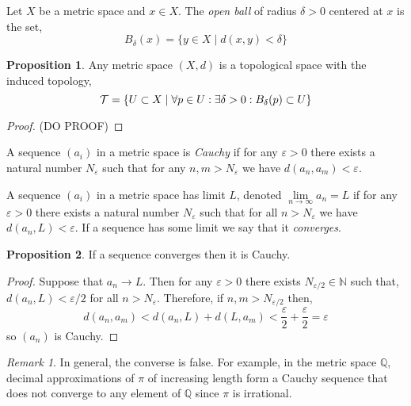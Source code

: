 \documentclass{article}
\newcommand{\N}{\mathbb{N}}
\newcommand{\ball}[2]{B_{#1} \! \left(#2 \right)}
\newcommand{\Q}{\mathbb{Q}}
\newenvironment{definition}[1][Definition:]{\begin{trivlist}
\item[\hskip \labelsep {\bfseries #1}]}{\end{trivlist}}
\theoremstyle{theorem}
\theoremstyle{definition}
\theoremstyle{definition}
\newtheorem*{proposition}{Proposition}
\theoremstyle{remark}
\theoremstyle{definition}
\theoremstyle{remark}
\newtheorem{remark}{Remark}[subsection]
\begin{document}
\begin{definition}
Let $X$ be a metric space and $x \in X$. The \textit{open ball} of radius $\delta > 0$ centered at $x$ is the set,
\[ \ball{\delta}{x} = \{ y \in X \mid d(x,y) < \delta \}\]
\end{definition}

\begin{proposition}
Any metric space $(X, d)$ is a topological space with the induced topology,
\[ \T = \{ U \subset X \mid \forall p \in U : \exists \delta > 0 : \ball{\delta}{p} \subset U \} \]
\end{proposition}

\begin{proof}
(DO PROOF)
\end{proof}

\begin{definition}
A sequence $(a_i)$ in a metric space is \textit{Cauchy} if for any $\varepsilon > 0$ there exists a natural number $N_{\varepsilon}$ such that for any $n,m > N_{\varepsilon}$ we have $d(a_n, a_m) < \varepsilon$. 
\end{definition}

\begin{definition}
A sequence $(a_i)$ in a metric space has limit $L$, denoted $\lim\limits_{n \to \infty} a_n = L$ if for any $\varepsilon > 0$ there exists a natural number $N_{\varepsilon}$ such that for all $n > N_{\varepsilon}$ we have $d(a_n, L) < \varepsilon$. If a sequence has some limit we say that it \textit{converges}.
\end{definition}

\begin{proposition}
If a sequence converges then it is Cauchy. 
\end{proposition}

\begin{proof}
Suppose that $a_n \to L$. Then for any $\varepsilon > 0$ there exists $N_{\varepsilon/2} \in \N$ such that, $d(a_n, L) < \varepsilon/2$ for all $n > N_{\varepsilon}$. Therefore, if $n,m > N_{\varepsilon/2}$ then,
\[ d(a_n, a_m) < d(a_n, L) + d(L, a_m) < \frac{\varepsilon}{2} + \frac{\varepsilon}{2} = \varepsilon \]
so $(a_n)$ is Cauchy. 
\end{proof}

\begin{remark}
In general, the converse is false. For example, in the metric space $\Q$, decimal approximations of $\pi$ of increasing length form a Cauchy sequence that does not converge to any element of $\Q$ since $\pi$ is irrational.  
\end{remark}
\end{document}
